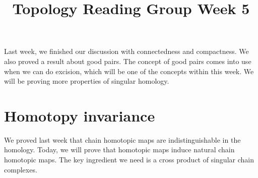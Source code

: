 \documentclass[12pt,reqno]{amsart}
\numberwithin{theorem}{section}
\theoremstyle{definition}
\theoremstyle{remark}
\numberwithin{equation}{section}
\theoremstyle{definition}
\begin{document}
\title{Topology Reading Group Week 5}
\maketitle
Last week, we finished our discussion with connectedness and compactness. We also proved a result about good pairs. The concept of good pairs comes into use when we can do excision, which will be one of the concepts within this week. We will be proving more properties of singular homology.
\section{Homotopy invariance}
We proved last week that chain homotopic maps are indistinguishable in the homology. Today, we will prove that homotopic maps induce natural chain homotopic maps. The key ingredient we need is a cross product of singular chain complexes.
\end{document}

